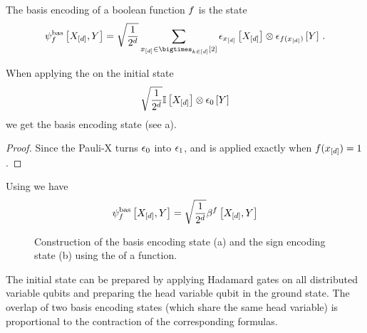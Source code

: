 \begin{definition}
    The basis encoding of a boolean function $f$ is the state
    \begin{align*}
        \basqstateofat{\exformula}{\shortcatvariables,\headvariable}
        = \sqrt{\frac{1}{2^\atomorder}} \sum_{\shortcatindices\in\atomstates} \onehotmapofat{\shortcatindices}{\shortcatvariables}
        \otimes \onehotmapofat{\exformula(\shortcatindices)}{\headvariable} \, .
    \end{align*}
\end{definition}

\begin{lemma}
    When applying the \computationCircuit{} on the initial state
    \begin{align*}
        \sqrt{\frac{1}{2^\atomorder}}\onesat{\shortcatvariables} \otimes \fbasisat{\headvariable} %
    \end{align*}
    we get the basis encoding state (see a).
\end{lemma}
\begin{proof}
    Since the Pauli-X turns $\epsilon_{0}$ into $\epsilon_{1}$, and is applied exactly when $f(x_{[d]})=1$.
\end{proof}


\begin{corollary}
    Using  we have
    \begin{align*}
        \basqstateofat{\exformula}{\shortcatvariables,\headvariable}
        = \sqrt{\frac{1}{2^{\catorder}}} \bencodingofat{\exformula}{\shortcatvariables,\headvariable}
    \end{align*}
\end{corollary}

\begin{figure}[t]
    \begin{center}
        
    \end{center}
    \caption{Construction of the basis encoding state (a) and the sign encoding state (b) using the \computationCircuit{} of a function.}\label{fig:basSignQstateConstruction}
\end{figure}

The initial state can be prepared by applying Hadamard gates on all distributed variable qubits and preparing the head variable qubit in the ground state.
The overlap of two basis encoding states (which share the same head variable) is proportional to the contraction of the corresponding formulas.

